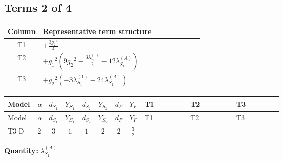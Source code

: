 \documentclass[8pt]{article}
\begin{document}
\begin{landscape}
\subsection*{Terms 2 of 4}
\begin{center}
\begin{tabular}{@{}c >{\raggedright\arraybackslash}p{0.82\linewidth}@{}}
\toprule
Column & Representative term structure \\
\midrule
T1 & \(\displaystyle +\frac{3 {g_2}^4}{4}\) \\
\midrule
T2 & \(\displaystyle +{g_1}^2 \left(9 {g_2}^2-\frac{3 {\lambda_{S_1}^{(1)}}}{2}-12 {\lambda_{S_1}^{(A)}}\right)\) \\
\midrule
T3 & \(\displaystyle +{g_2}^2 (-3 {\lambda_{S_1}^{(1)}}-24 {\lambda_{S_1}^{(A)}})\) \\
\midrule
\bottomrule
\end{tabular}
\end{center}
\smallskip
\tiny
\begin{longtable}{@{}llcccccc >{\raggedright\arraybackslash}p{0.21\linewidth} >{\raggedright\arraybackslash}p{0.21\linewidth} >{\raggedright\arraybackslash}p{0.21\linewidth}@{}}
\toprule
Model & $\alpha$ & $d_{S_1}$ & $Y_{S_1}$ & $d_{S_2}$ & $Y_{S_2}$ & $d_F$ & $Y_F$ & T1 & T2 & T3 \\
\midrule
\endfirsthead
\toprule
Model & $\alpha$ & $d_{S_1}$ & $Y_{S_1}$ & $d_{S_2}$ & $Y_{S_2}$ & $d_F$ & $Y_F$ & T1 & T2 & T3 \\
\midrule
\endhead
T3-D & $2$ & $3$ & $1$ & $1$ & $2$ & $2$ & $\frac{3}{2}$ & \scriptsize\adjustbox{max width=\linewidth}{$\begin{gathered} +\frac{3 {g_2}^4}{4}\end{gathered}$} & \scriptsize\adjustbox{max width=\linewidth}{$\begin{gathered} +{g_1}^2 \left(9 {g_2}^2-\frac{3 {\lambda_{S_1}^{(1)}}}{2}-12 {\lambda_{S_1}^{(A)}}\right)\end{gathered}$} & \scriptsize\adjustbox{max width=\linewidth}{$\begin{gathered} +{g_2}^2 (-3 {\lambda_{S_1}^{(1)}}-24 {\lambda_{S_1}^{(A)}})\end{gathered}$} \\
\midrule
\bottomrule
\end{longtable}
\clearpage
\noindent\textbf{Quantity: }$\lambda_{S_1}^{(A)}$\par\smallskip

\end{landscape}
\end{document}
